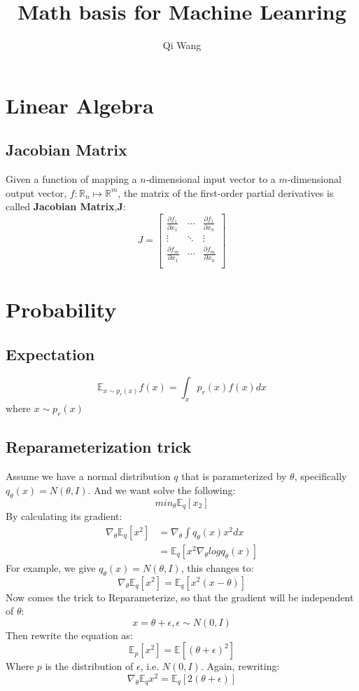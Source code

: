 \documentclass{article}
\title{Math basis for Machine Leanring}
\author{Qi Wang}
\begin{document}
\maketitle   
\section*{Linear Algebra}
\subsection*{Jacobian Matrix}
Given a function of mapping a $n$-dimensional input vector to a $m$-dimensional output vector, $f:\mathbb{R}_{n} \mapsto  \mathbb{R}^{m}$, the matrix of the first-order partial derivatives is called \textbf{Jacobian Matrix},\textbf{J}:
\[
    J = \begin{bmatrix}
    \frac{\partial{f_{1}}}{\partial{x_{1}}} &\cdots &\frac{\partial{f_{1}}}{\partial{x_{n}}}\\
    \vdots &\ddots &\vdots\\
    \frac{\partial{f_{m}}}{\partial{x_{1}}} &\cdots &\frac{\partial{f_{m}}}{\partial{x_{n}}}\\
\end{bmatrix}
\]
\section*{Probability}
\subsection*{Expectation}
\[
    \mathbb{E}_{x\sim{p_{r}(x)}} f(x) = \int_{x}p_{r}(x)f(x)dx   
\]
where $x\sim{p_{r}(x)}$
\subsection*{Reparameterization trick}
Assume we have a normal distribution $q$ that is parameterized by $\theta$, specifically $q_{\theta}(x) = N(\theta,I)$. And we want solve the following:
\[
min_{\theta} \mathbb{E}_{q}[x_2]    
\]
By calculating its gradient:
\[
\begin{split}
\nabla_{\theta}\mathbb{E}_{q}[x^2] &= \nabla_{\theta}\int{}{}q_{\theta}(x)x^2dx \\
&=\mathbb{E}_{q}[x^2\nabla_{\theta}logq_{\theta}(x)]
\end{split}
\]
For example, we give $q_{\theta}(x) = N(\theta,I)$, this changes to:
\[
    \nabla_{\theta}\mathbb{E}_{q}[x^2] = \mathbb{E}_{q}[x^2(x-\theta)]    
\]
Now comes the trick to Reparameterize, so that the gradient will be independent of $\theta$:
\[
x = \theta + \epsilon, \epsilon \sim N(0,I)    
\]
Then rewrite the equation as:
\[
\mathbb{E}_{p}[x^2] = \mathbb{E}[(\theta + \epsilon)^2]    
\]
Where $p$ is the distribution of $\epsilon$, i.e. $N(0,I)$. Again, rewriting:
\[
\nabla_{\theta}\mathbb{E}_{q}{x^2} = \mathbb{E}_{q}[2(\theta+\epsilon)]    
\]
\end{document}
